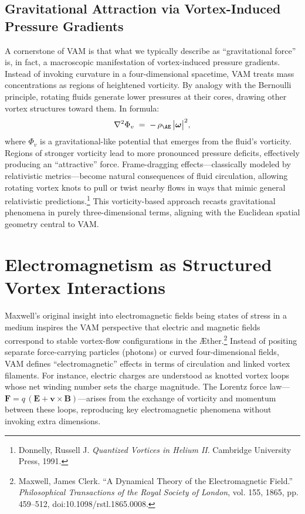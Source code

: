 \documentclass[aps,preprint,superscriptaddress]{revtex4-2}
\begin{document}
    \subsection*{Gravitational Attraction via Vortex-Induced Pressure Gradients}

    A cornerstone of VAM is that what we typically describe as “gravitational force” is, in fact, a macroscopic manifestation of vortex-induced pressure gradients. Instead of invoking curvature in a four-dimensional spacetime, VAM treats mass concentrations as regions of heightened vorticity. By analogy with the Bernoulli principle, rotating fluids generate lower pressures at their cores, drawing other vortex structures toward them. In formula:
    \[
        \nabla^2 \Phi_{v} \;=\; -\,\rho_{\mathrm{\AE}} \,\bigl|\boldsymbol{\omega}\bigr|^{2},
    \]
    where \(\Phi_{v}\) is a gravitational-like potential that emerges from the fluid’s vorticity. Regions of stronger vorticity lead to more pronounced pressure deficits, effectively producing an “attractive” force. Frame-dragging effects—classically modeled by relativistic metrics—become natural consequences of fluid circulation, allowing rotating vortex knots to pull or twist nearby flows in ways that mimic general relativistic predictions.\footnote{Donnelly, Russell J. \textit{Quantized Vortices in Helium II}. Cambridge University Press, 1991.} This vorticity-based approach recasts gravitational phenomena in purely three-dimensional terms, aligning with the Euclidean spatial geometry central to VAM.

    \section{Electromagnetism as Structured Vortex Interactions}

    Maxwell’s original insight into electromagnetic fields being states of stress in a medium inspires the VAM perspective that electric and magnetic fields correspond to stable vortex-flow configurations in the Æther.\footnote{Maxwell, James Clerk. “A Dynamical Theory of the Electromagnetic Field.” \textit{Philosophical Transactions of the Royal Society of London}, vol. 155, 1865, pp. 459–512, doi:10.1098/rstl.1865.0008.} Instead of positing separate force-carrying particles (photons) or curved four-dimensional fields, VAM defines “electromagnetic” effects in terms of circulation and linked vortex filaments. For instance, electric charges are understood as knotted vortex loops whose net winding number sets the charge magnitude. The Lorentz force law—\(\mathbf{F} = q\,(\mathbf{E} + \mathbf{v}\times\mathbf{B})\)—arises from the exchange of vorticity and momentum between these loops, reproducing key electromagnetic phenomena without invoking extra dimensions.
\end{document}
